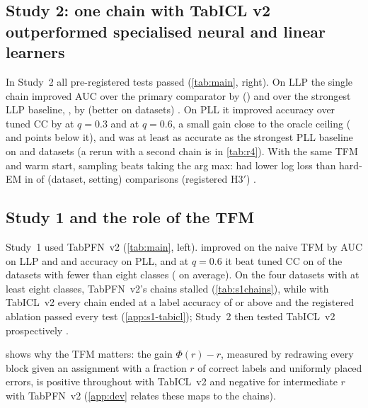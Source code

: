 \subsection{Study 2: one chain with TabICL v2 outperformed specialised neural and linear learners}\label{sec:s2}
In Study~2 all pre-registered tests passed (\cref{tab:main}, right). On LLP the single chain improved
AUC over the primary comparator by   () and over the
strongest LLP baseline, , by  
(better on  datasets) . On PLL it improved accuracy over tuned CC by
 at $q=0.3$ and  at $q=0.6$, a small gain close to the oracle ceiling
( and  points below it), and was at least as accurate as the strongest
PLL baseline on  and  datasets  (a rerun with a second chain is in
\cref{tab:r4}). With the same TFM and warm start, sampling beats taking the arg max: \ours{} had lower log loss than
hard-EM in  of  (dataset, setting) comparisons (registered H3$'$) .

\subsection{Study 1 and the role of the TFM}\label{sec:tfm}
Study~1 used TabPFN~v2 (\cref{tab:main}, left). \ours{} improved on the naive TFM by  AUC on
LLP and  and  accuracy on PLL, and at $q=0.6$ it beat tuned CC on
 of the  datasets with fewer than eight classes ( on
average). On the four datasets with at least eight classes, TabPFN~v2's chains stalled (\cref{tab:s1chains}), while
with TabICL~v2 every chain ended at a label accuracy of  or above and the registered ablation
passed every test (\cref{app:s1-tabicl}); Study~2 then tested TabICL~v2 prospectively .

 shows why the TFM matters: the gain $\Phi(r)-r$, measured by redrawing every block given an
assignment with a fraction $r$ of correct labels and uniformly placed errors, is positive throughout with TabICL~v2 and
negative for intermediate $r$ with TabPFN~v2 (\cref{app:dev} relates these maps to the chains).

